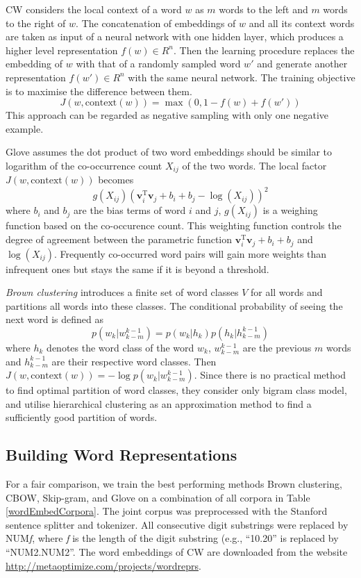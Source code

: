 CW considers the local context of a word $w$ as $m$ words to the left and $m$ words to the right of $w$. The concatenation of embeddings of $w$ and all its context words are taken as input of a neural network with one hidden layer, which produces a higher level representation $f(w) \in R^n$. Then the learning procedure replaces the embedding of $w$ with that of a randomly sampled word $w'$ and generate another representation $f(w') \in R^n$ with the same neural network. The training objective is to maximise the difference between them.
\begin{equation}
J(w, \text{context}(w)) = \max (0, 1 - f(w) + f(w'))
\end{equation}
This approach can be regarded as negative sampling with only one negative example.

Glove assumes the dot product of two word embeddings should be similar to logarithm of the co-occurrence count $X_{ij}$ of the two words. The local factor $J(w, \text{context}(w))$ becomes
\begin{equation}
g(X_{ij}) (\mathbf{v}_i^{\text{T}} \mathbf{v}_j + b_i + b_j - \log(X_{ij}))^2
\end{equation}
where $b_i$ and $b_j$ are the bias terms of word $i$ and $j$, $g(X_{ij})$ is a weighing function based on the co-occurence count. This weighting function controls the degree of agreement between the parametric function $\mathbf{v}_i^{\text{T}} \mathbf{v}_j + b_i + b_j $ and $\log(X_{ij})$. Frequently co-occurred word pairs will gain more weights than infrequent ones but stays the same if it is beyond a threshold.

\textit{Brown clustering} introduces a finite set of word classes $V$ for all words and partitions all words into these classes. The conditional probability of seeing the next word is defined as
\begin{equation}
p(w_k | w_{k - m}^{k -1}) = p(w_k | h_k) p(h_k | h_{k - m}^{k -1})
\end{equation}
where $h_k$ denotes the word class of the word $w_k$, $w_{k - m}^{k -1}$ are the previous $m$ words and $h_{k - m}^{k -1}$ are their respective word classes. Then $J(w, \text{context}(w)) = - \log p(w_k | w_{k - m}^{k -1}) $. Since there is no practical method to find optimal partition of word classes, they consider only bigram class model, and utilise hierarchical clustering as an approximation method to find a sufficiently good partition of words. 

\subsection{Building Word Representations}
\label{buildingWordRep}
For a fair comparison, we train the best performing methods Brown clustering, CBOW, Skip-gram, and Glove on a combination of all corpora in Table \ref{wordEmbedCorpora}. The joint corpus was preprocessed with the Stanford sentence splitter and tokenizer. All consecutive digit substrings were replaced by NUM\textit{f}, where \textit{f} is the length of the digit substring (e.g., ``10.20'' is replaced by ``NUM2.NUM2''. The word embeddings of CW are downloaded from the website \url{http://metaoptimize.com/projects/wordreprs}.

